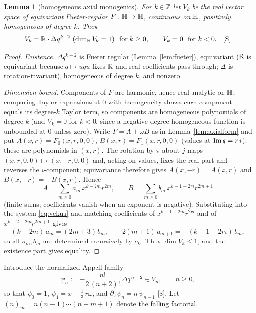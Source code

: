 \documentclass[11pt]{amsart}
\newtheorem{lemma}[theorem]{Lemma}
\theoremstyle{definition}
\theoremstyle{remark}
\begin{document}
\begin{lemma}[homogeneous axial monogenics]\label{lem:homog}
For $k\in\mathbb{Z}$ let $V_k$ be the real vector space of equivariant
Fueter-regular $F:\mathbb{H}\to\mathbb{H}$, continuous on $\mathbb{H}$, positively homogeneous
of degree $k$.  Then
\[
V_k=\mathbb{R}\cdot\Delta q^{k+2}\ (\dim_{\mathbb{R}} V_k=1)\ \text{ for }k\ge0,
\qquad V_k=0\ \text{ for }k<0.  \quad\textup{[S]}
\]
\end{lemma}

\begin{proof}
\emph{Existence.}  $\Delta q^{k+2}$ is Fueter regular
(Lemma~\ref{lem:fueter}), equivariant ($\mathsf{R}$ is equivariant because
$q\mapsto uq\bar u$ fixes $\mathbb{R}$ and real coefficients pass through;
$\Delta$ is rotation-invariant), homogeneous of degree $k$, and nonzero.

\emph{Dimension bound.}  Components of $F$ are harmonic, hence
real-analytic on $\mathbb{H}$; comparing Taylor expansions at $0$ with
homogeneity shows each component equals its degree-$k$ Taylor term, so
components are homogeneous polynomials of degree $k$ (and $V_k=0$ for
$k<0$, since a negative-degree homogeneous function is unbounded at $0$
unless zero).  Write $F=A+\omega B$ as in Lemma~\ref{lem:axialform} and
put $A(x,r)=F_0(x,r,0,0)$, $B(x,r)=F_1(x,r,0,0)$ (values at
$\operatorname{Im} q=r\,i$): these are polynomials in $(x,r)$.  The rotation by $\pi$
about $j$ maps $(x,r,0,0)\mapsto(x,-r,0,0)$ and, acting on values, fixes
the real part and reverses the $i$-component; equivariance therefore
gives $A(x,-r)=A(x,r)$ and $B(x,-r)=-B(x,r)$.  Hence
\[
A=\sum_{m\ge0}a_m\,x^{k-2m}r^{2m},\qquad
B=\sum_{m\ge0}b_m\,x^{k-1-2m}r^{2m+1}
\]
(finite sums; coefficients vanish when an exponent is negative).
Substituting into the system \eqref{eq:vekua} and matching coefficients
of $x^{k-1-2m}r^{2m}$ and of $x^{k-2-2m}r^{2m+1}$ gives
\[
(k-2m)\,a_m=(2m+3)\,b_m,\qquad
2(m+1)\,a_{m+1}=-(k-1-2m)\,b_m ,
\]
so all $a_m,b_m$ are determined recursively by $a_0$.  Thus
$\dim V_k\le1$, and the existence part gives equality.
\end{proof}

Introduce the normalized Appell family
\[
\psi_n:=-\frac{n!}{2\,(n+2)!}\,\Delta q^{\,n+2}\in V_n,
\qquad n\ge0,
\]
so that $\psi_0=1$, $\psi_1=x+\tfrac13\,r\omega$, and
$\partial_x\psi_n=n\,\psi_{n-1}$ [S].  Let
$(n)_m=n(n-1)\cdots(n-m+1)$ denote the falling factorial.
\end{document}
